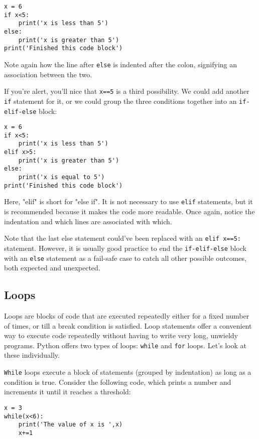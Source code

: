 \documentclass[12pt]{article}
\newcommand{\code}{\texttt}
\begin{document}
\begin{lstlisting}[frame=single] 
x = 6
if x<5:
    print('x is less than 5')
else:
    print('x is greater than 5')
print('Finished this code block')
\end{lstlisting}

Note again how the line after \code{else} is indented after the colon, signifying an association between the two.

If you're alert, you'll nice that \code{x==5} is a third possibility. We could add another \code{if} statement for it, or we could group the three conditions together into an \code{if-elif-else} block:

\begin{lstlisting}[frame=single] 
x = 6
if x<5:
    print('x is less than 5')
elif x>5:
    print('x is greater than 5')
else:
    print('x is equal to 5')
print('Finished this code block')
\end{lstlisting}

Here, "elif" is short for "else if". It is not necessary to use \code{elif} statements, but it is recommended because it makes the code more readable. Once again, notice the indentation and which lines are associated with which. 

Note that the last else statement could've been replaced with an \code{elif x==5:} statement. However, it is usually good practice to end the \code{if-elif-else} block with an \code{else} statement as a fail-safe case to catch all other possible outcomes, both expected and unexpected.

\subsection{Loops}
Loops are blocks of code that are executed repeatedly either for a fixed number of times, or till a break condition is satisfied. Loop statements offer a convenient way to execute code repeatedly without having to write very long, unwieldy programs. Python offers two types of loops: \code{while} and \code{for} loops. Let's look at these individually. 

\code{While} loops execute a block of statements (grouped by indentation) as long as a condition is true. Consider the following code, which prints a number and increments it until it reaches a threshold:

\begin{lstlisting}[frame=single] 
x = 3
while(x<6):
    print('The value of x is ',x)
    x+=1
\end{lstlisting}
\end{document}
